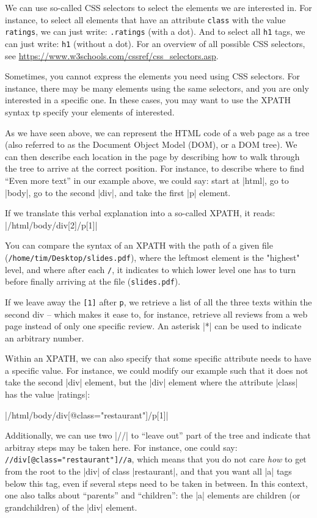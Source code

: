 We can use so-called CSS selectors to select the elements we are
interested in.  For instance, to select all elements that have an
attribute \texttt{class} with the value \texttt{ratings}, we can just
write: \texttt{.ratings} (with a dot).  And to select all \texttt{h1}
tags, we can just write: \texttt{h1} (without a dot).
For an overview of all possible CSS selectors, see
\url{https://www.w3schools.com/cssref/css_selectors.asp}.

Sometimes, you cannot express the elements you need using CSS
selectors. For instance, there may be many elements using the same
selectors, and you are only interested in a specific one. In these
cases, you may want to use the XPATH syntax tp specify your elements
of interested.

As we have seen above, we can represent the HTML code of a web page as
a tree (also referred to as the Document Object Model (DOM), or a DOM
tree). We can then describe each location in the page by describing
how to walk through the tree to arrive at the correct position.  For
instance, to describe where to find ``Even more text'' in our example
above, we could say: start at |html|, go to |body|, go to the second |div|,
and take the first |p| element.

If we translate this verbal explanation into a so-called XPATH, it reads:
|/html/body/div[2]/p[1]|

 You can compare the syntax of an XPATH with the path of a given file
 (\texttt{/home/tim/Desktop/slides.pdf}), where the leftmost element
 is the "highest" level, and where after each \texttt{/}, it indicates
 to which lower level one has to turn before finally arriving at the
 file (\texttt{slides.pdf}).

If we leave away the \texttt{[1]} after \texttt{p}, we retrieve a list
of all the three texts within the second div -- which makes it ease
to, for instance, retrieve all reviews from a web page instead of only
one specific review. An asterisk |*| can be used to indicate an
arbitrary number.

Within an XPATH, we can also specify that some specific attribute
needs to have a specific value. For instance, we could modify our
example such that it does not take the second |div| element, but the
|div| element where the attribute |class| has the value |ratings|:

|/html/body/div[@class="restaurant"]/p[1]|

Additionally, we can use two |//| to ``leave out'' part of the tree
and indicate that arbitray steps may be taken here. For instance, one
could say: \texttt{//div[@class="restaurant"]//a}, which means that
you do not care \emph{how} to get from the root to the |div| of class
|restaurant|, and that you want all |a| tags below this tag, even if
several steps need to be taken in between. In this context, one also
talks about ``parents'' and ``children'': the |a| elements are
children (or grandchildren) of the |div| element.


